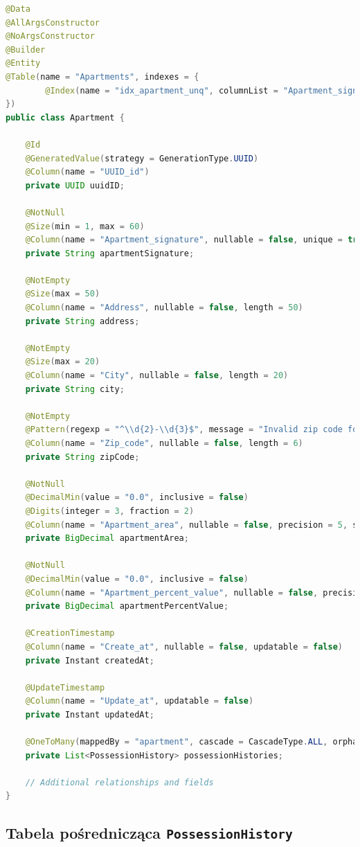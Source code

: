 \begin{lstlisting}[language=Java, style=JavaStyle, caption=Encja mieszkania \texttt{Apartment}]
@Data
@AllArgsConstructor
@NoArgsConstructor
@Builder
@Entity
@Table(name = "Apartments", indexes = {
        @Index(name = "idx_apartment_unq", columnList = "Apartment_signature", unique = true)
})
public class Apartment {

    @Id
    @GeneratedValue(strategy = GenerationType.UUID)
    @Column(name = "UUID_id")
    private UUID uuidID;

    @NotNull
    @Size(min = 1, max = 60)
    @Column(name = "Apartment_signature", nullable = false, unique = true, length = 60)
    private String apartmentSignature;

    @NotEmpty
    @Size(max = 50)
    @Column(name = "Address", nullable = false, length = 50)
    private String address;

    @NotEmpty
    @Size(max = 20)
    @Column(name = "City", nullable = false, length = 20)
    private String city;

    @NotEmpty
    @Pattern(regexp = "^\\d{2}-\\d{3}$", message = "Invalid zip code format")
    @Column(name = "Zip_code", nullable = false, length = 6)
    private String zipCode;

    @NotNull
    @DecimalMin(value = "0.0", inclusive = false)
    @Digits(integer = 3, fraction = 2)
    @Column(name = "Apartment_area", nullable = false, precision = 5, scale = 2)
    private BigDecimal apartmentArea;

    @NotNull
    @DecimalMin(value = "0.0", inclusive = false)
    @Column(name = "Apartment_percent_value", nullable = false, precision = 5, scale = 2)
    private BigDecimal apartmentPercentValue;

    @CreationTimestamp
    @Column(name = "Create_at", nullable = false, updatable = false)
    private Instant createdAt;

    @UpdateTimestamp
    @Column(name = "Update_at", updatable = false)
    private Instant updatedAt;

    @OneToMany(mappedBy = "apartment", cascade = CascadeType.ALL, orphanRemoval = true)
    private List<PossessionHistory> possessionHistories;

    // Additional relationships and fields
}
\end{lstlisting}

\subsection{Tabela pośrednicząca \texttt{PossessionHistory}}

